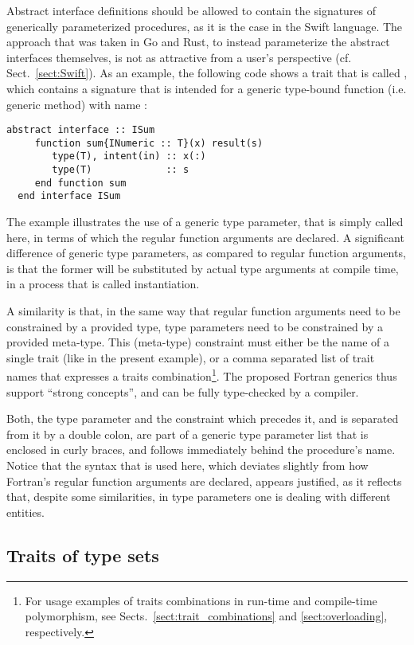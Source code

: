\documentclass[11pt,oneside]{report}
\newcommand{\code}[1]{{\selectfont\ttfamily{#1}}}
\begin{document}
Abstract interface definitions should be allowed to contain the signatures
of generically parameterized procedures, as it is the case in the
Swift language. The approach that was taken in Go and Rust, to instead
parameterize the abstract interfaces themselves, is not as attractive
from a user's perspective (cf. Sect.~\ref{sect:Swift}). As an example,
the following code shows a trait that is called \code{ISum}, which
contains a signature that is intended for a generic type-bound
function (i.e. generic method) with name \code{sum}:
\begin{lstlisting}[language=LFortran,style=boxed]
  abstract interface :: ISum
     function sum{INumeric :: T}(x) result(s)
        type(T), intent(in) :: x(:)
        type(T)             :: s
     end function sum
  end interface ISum
\end{lstlisting}

The example illustrates the use of a generic type parameter, that is
simply called \code{T} here, in terms of which the regular function
arguments are declared. A significant difference of generic type
parameters, as compared to regular function arguments, is that the
former will be substituted by actual type arguments at compile time,
in a process that is called instantiation.

A similarity is that, in the same way that regular function arguments
need to be constrained by a provided type, type parameters need to be
constrained by a provided meta-type. This (meta-type) constraint must
either be the name of a single trait (like \code{INumeric} in the
present example), or a comma separated list of trait names that
expresses a traits combination\footnote{For usage examples of traits
combinations in run-time and compile-time polymorphism, see
Sects.~\ref{sect:trait_combinations} and \ref{sect:overloading},
respectively.}. The proposed Fortran generics thus support ``strong
concepts'', and can be fully type-checked by a compiler.

Both, the type parameter and the constraint which precedes it, and is
separated from it by a double colon, are part of a generic type
parameter list that is enclosed in curly braces, and follows
immediately behind the procedure's name. Notice that the syntax that
is used here, which deviates slightly from how Fortran's regular
function arguments are declared, appears justified, as it reflects
that, despite some similarities, in type parameters one is dealing
with different entities.

\subsection{Traits of type sets}
\label{sect:type_sets}
\end{document}
